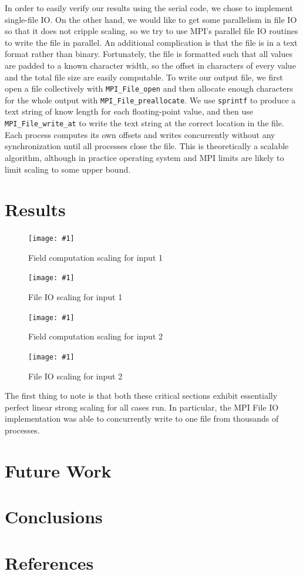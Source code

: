 \documentclass[twocolumn]{article}
\newcommand{\myimage}[3]{
\begin{figure}[!ht]
\caption{#2}
\label{#3}
\texttt{[image: \#1]}
\end{figure}
}
\begin{document}
In order to easily verify our results using the serial code,
we chose to implement single-file IO.
On the other hand, we would like to get some parallelism in
file IO so that it does not cripple scaling, so we try to use
MPI's parallel file IO routines to write the file in parallel.
An additional complication is that the file is in a text format
rather than binary.
Fortunately, the file is formatted such that all values are
padded to a known character width, so the offset in characters
of every value and the total file size are easily computable.
To write our output file, we first open a file collectively
with \texttt{MPI\_File\_open} and then 
allocate enough characters for the whole output with
\texttt{MPI\_File\_preallocate}.
We use
\texttt{sprintf} to produce a text string of know length for
each floating-point value, and then use
\texttt{MPI\_File\_write\_at} to write the text string at
the correct location in the file.
Each process computes its own offsets and writes concurrently
without any synchronization until all processes close the file.
This is theoretically a scalable algorithm, although in practice
operating system and MPI limits are likely to limit scaling
to some upper bound.

\section{Results}



\myimage{one_calc.png}{Field computation scaling for input 1}{fig:calc1}
\myimage{one_file.png}{File IO scaling for input 1}{fig:file1}
\myimage{two_calc.png}{Field computation scaling for input 2}{fig:calc2}
\myimage{two_file.png}{File IO scaling for input 2}{fig:file2}

The first thing to note is that both these critical sections exhibit
essentially perfect linear strong scaling for all cases run.
In particular, the MPI File IO implementation was able to concurrently
write to one file from thousands of processes.

\section{Future Work}

\section{Conclusions}

\section{References}
\end{document}

